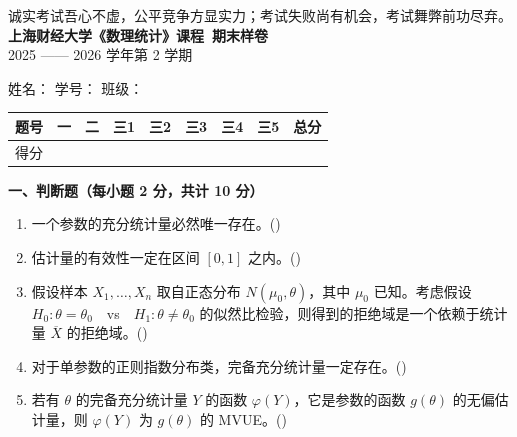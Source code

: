 \documentclass[12pt,a4paper]{ctexart}
\newcommand{\question}[2]{\bigskip\noindent\textbf{#1}\par\nobreak\medskip}
\begin{document}
\begin{center}
  {\small 诚实考试吾心不虚，公平竞争方显实力；考试失败尚有机会，考试舞弊前功尽弃。}\\[2mm]
  {\LARGE\bfseries 上海财经大学《数理统计》课程\ 期末样卷}\\[2mm]
  {\small 2025 —— 2026 学年第 2 学期}
\end{center}

\vspace{2mm}
\noindent
姓名：\underline{\hspace{2.6cm}}\hfill
学号：\underline{\hspace{2.6cm}}\hfill
班级：\underline{\hspace{2.6cm}}

\vspace{3mm}
\begin{center}
\renewcommand{\arraystretch}{1.6}
\begin{tabular}{|c|c|c|c|c|c|c|c|c|}
\hline
题号 & 一 & 二 & 三1 & 三2 & 三3 & 三4 & 三5 & 总分 \\ \hline
得分 & & & & & & & & \\ \hline
\end{tabular}
\end{center}

\question{一、判断题（每小题 2 分，共计 10 分）}{10}
\begin{enumerate}[label=\arabic*.,leftmargin=2.2em]
  \item 一个参数的充分统计量必然唯一存在。\hfill(\underline{\hspace{1.2cm}})
  \item 估计量的有效性一定在区间 $[0,1]$ 之内。\hfill(\underline{\hspace{1.2cm}})
  \item 假设样本 $X_{1},\ldots,X_{n}$ 取自正态分布 $N(\mu_{0},\theta)$，其中 $\mu_{0}$ 已知。考虑假设 $H_{0}:\theta=\theta_{0}$\ \ vs\ \ $H_{1}:\theta\neq\theta_{0}$ 的似然比检验，则得到的拒绝域是一个依赖于统计量 $\overline{X}$ 的拒绝域。\hfill(\underline{\hspace{1.2cm}})
  \item 对于单参数的正则指数分布类，完备充分统计量一定存在。\hfill(\underline{\hspace{1.2cm}})
  \item 若有 $\theta$ 的完备充分统计量 $Y$ 的函数 $\varphi(Y)$，它是参数的函数 $g(\theta)$ 的无偏估计量，则 $\varphi(Y)$ 为 $g(\theta)$ 的 MVUE。\hfill(\underline{\hspace{1.2cm}})
\end{enumerate}
\end{document}
